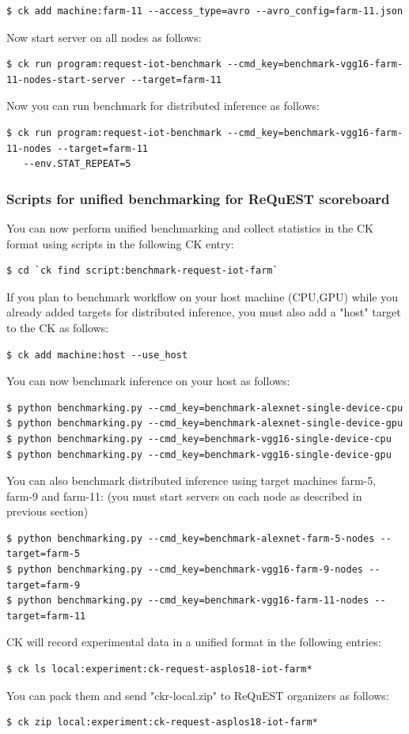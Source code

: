 \documentclass[sigplan]{acmart}
\begin{document}
\begin{verbatim}
$ ck add machine:farm-11 --access_type=avro --avro_config=farm-11.json
\end{verbatim}

Now start server on all nodes as follows:
\begin{verbatim}
$ ck run program:request-iot-benchmark --cmd_key=benchmark-vgg16-farm-11-nodes-start-server --target=farm-11 
\end{verbatim}
Now you can run benchmark for distributed inference as follows:
\begin{verbatim}
$ ck run program:request-iot-benchmark --cmd_key=benchmark-vgg16-farm-11-nodes --target=farm-11
   --env.STAT_REPEAT=5
\end{verbatim}

\subsubsection{Scripts for unified benchmarking for ReQuEST scoreboard}

You can now perform unified benchmarking and collect statistics in the CK format using scripts in the following CK entry:
\begin{verbatim}
$ cd `ck find script:benchmark-request-iot-farm`
\end{verbatim}

If you plan to benchmark workflow on your host machine (CPU,GPU) while you already added targets for distributed inference, 
you must also add a "host" target to the CK as follows:
\begin{verbatim}
$ ck add machine:host --use_host
\end{verbatim}

You can now benchmark inference on your host as follows:
\begin{verbatim}
$ python benchmarking.py --cmd_key=benchmark-alexnet-single-device-cpu
$ python benchmarking.py --cmd_key=benchmark-alexnet-single-device-gpu
$ python benchmarking.py --cmd_key=benchmark-vgg16-single-device-cpu
$ python benchmarking.py --cmd_key=benchmark-vgg16-single-device-gpu
\end{verbatim}

You can also benchmark distributed inference using target machines farm-5, farm-9 and farm-11:
(you must start servers on each node as described in previous section)
\begin{verbatim}
$ python benchmarking.py --cmd_key=benchmark-alexnet-farm-5-nodes --target=farm-5
$ python benchmarking.py --cmd_key=benchmark-vgg16-farm-9-nodes --target=farm-9
$ python benchmarking.py --cmd_key=benchmark-vgg16-farm-11-nodes --target=farm-11
\end{verbatim}

CK will record experimental data in a unified format in the following entries:
\begin{verbatim}
$ ck ls local:experiment:ck-request-asplos18-iot-farm*
\end{verbatim}

You can pack them and send "ckr-local.zip" to ReQuEST organizers as follows:
\begin{verbatim}
$ ck zip local:experiment:ck-request-asplos18-iot-farm*
\end{verbatim}
\end{document}
